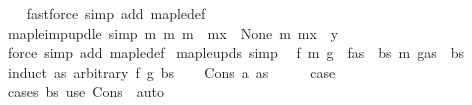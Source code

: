\begin{isabellebody}
%
\isadelimproof
\ \ %
\endisadelimproof
%
\isatagproof
{}\isamarkupfalse%
\ {\isacharparenleft}{\kern0pt}fastforce\ simp\ add{\isacharcolon}{\kern0pt}\ map{\isacharunderscore}{\kern0pt}le{\isacharunderscore}{\kern0pt}def{\isacharparenright}{\kern0pt}%
\endisatagproof
{\isafoldproof}%
%
\isadelimproof
\isanewline
%
\endisadelimproof
\isanewline
{}\isamarkupfalse%
\ map{\isacharunderscore}{\kern0pt}le{\isacharunderscore}{\kern0pt}imp{\isacharunderscore}{\kern0pt}upd{\isacharunderscore}{\kern0pt}le\ {\isacharbrackleft}{\kern0pt}simp{\isacharbrackright}{\kern0pt}{\isacharcolon}{\kern0pt}\ {\isachardoublequoteopen}m{}\ {\isasymsubseteq}\isactrlsub m\ m{}\ {\isasymLongrightarrow}\ m{}{\isacharparenleft}{\kern0pt}x\ {\isacharcolon}{\kern0pt}{\isacharequal}{\kern0pt}\ None{\isacharparenright}{\kern0pt}\ {\isasymsubseteq}\isactrlsub m\ m{}{\isacharparenleft}{\kern0pt}x\ {\isasymmapsto}\ y{\isacharparenright}{\kern0pt}{\isachardoublequoteclose}\isanewline
%
\isadelimproof
\ \ %
\endisadelimproof
%
\isatagproof
{}\isamarkupfalse%
\ {\isacharparenleft}{\kern0pt}force\ simp\ add{\isacharcolon}{\kern0pt}\ map{\isacharunderscore}{\kern0pt}le{\isacharunderscore}{\kern0pt}def{\isacharparenright}{\kern0pt}%
\endisatagproof
{\isafoldproof}%
%
\isadelimproof
\isanewline
%
\endisadelimproof
\isanewline
{}\isamarkupfalse%
\ map{\isacharunderscore}{\kern0pt}le{\isacharunderscore}{\kern0pt}upds\ {\isacharbrackleft}{\kern0pt}simp{\isacharbrackright}{\kern0pt}{\isacharcolon}{\kern0pt}\isanewline
\ \ {\isachardoublequoteopen}f\ {\isasymsubseteq}\isactrlsub m\ g\ {\isasymLongrightarrow}\ f{\isacharparenleft}{\kern0pt}as\ {\isacharbrackleft}{\kern0pt}{\isasymmapsto}{\isacharbrackright}{\kern0pt}\ bs{\isacharparenright}{\kern0pt}\ {\isasymsubseteq}\isactrlsub m\ g{\isacharparenleft}{\kern0pt}as\ {\isacharbrackleft}{\kern0pt}{\isasymmapsto}{\isacharbrackright}{\kern0pt}\ bs{\isacharparenright}{\kern0pt}{\isachardoublequoteclose}\isanewline
%
\isadelimproof
%
\endisadelimproof
%
\isatagproof
{}\isamarkupfalse%
\ {\isacharparenleft}{\kern0pt}induct\ as\ arbitrary{\isacharcolon}{\kern0pt}\ f\ g\ bs{\isacharparenright}{\kern0pt}\isanewline
\ \ \isamarkupfalse%
\ {\isacharparenleft}{\kern0pt}Cons\ a\ as{\isacharparenright}{\kern0pt}\isanewline
\ \ \isamarkupfalse%
\ \isamarkupfalse%
\ {\isacharquery}{\kern0pt}case\isanewline
\ \ \ \ \isamarkupfalse%
\ {\isacharparenleft}{\kern0pt}cases\ bs{\isacharparenright}{\kern0pt}\ {\isacharparenleft}{\kern0pt}use\ Cons\ \ auto{\isacharparenright}{\kern0pt}\isanewline

\end{isabellebody}
